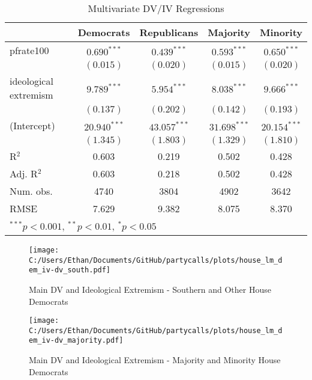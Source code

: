 \documentclass[12pt]{article}
\begin{document}
\begin{table}[!htb]
	\begin{center}
		\caption{Multivariate DV/IV Regressions}
		\begin{tabular}{l c c c c }
			\hline
			& Democrats & Republicans & Majority & Minority \\
			\hline
			pfrate100              & $0.690^{***}$  & $0.439^{***}$  & $0.593^{***}$  & $0.650^{***}$  \\
			& $(0.015)$      & $(0.020)$      & $(0.015)$      & $(0.020)$      \\
			ideological extremism & $9.789^{***}$  & $5.954^{***}$  & $8.038^{***}$  & $9.666^{***}$  \\
			& $(0.137)$      & $(0.202)$      & $(0.142)$      & $(0.193)$      \\
			(Intercept)            & $20.940^{***}$ & $43.057^{***}$ & $31.698^{***}$ & $20.154^{***}$ \\
			& $(1.345)$      & $(1.803)$      & $(1.329)$      & $(1.810)$      \\
			\hline
			R$^2$                  & 0.603          & 0.219          & 0.502          & 0.428          \\
			Adj. R$^2$             & 0.603          & 0.218          & 0.502          & 0.428          \\
			Num. obs.              & 4740           & 3804           & 4902           & 3642           \\
			RMSE                   & 7.629          & 9.382          & 8.075          & 8.370          \\
			\hline
			\multicolumn{5}{l}{\scriptsize{$^{***}p<0.001$, $^{**}p<0.01$, $^*p<0.05$}}
		\end{tabular}
	\end{center}
\end{table}

\begin{figure}[ht]
	\caption{Main DV and Ideological Extremism - Southern and Other House Democrats}
	\texttt{[image: C:/Users/Ethan/Documents/GitHub/partycalls/plots/house\_lm\_dem\_iv-dv\_south.pdf]}
\end{figure}

\begin{figure}[ht]
	\caption{Main DV and Ideological Extremism - Majority and Minority House Democrats}
	\texttt{[image: C:/Users/Ethan/Documents/GitHub/partycalls/plots/house\_lm\_dem\_iv-dv\_majority.pdf]}
\end{figure}
\end{document}
